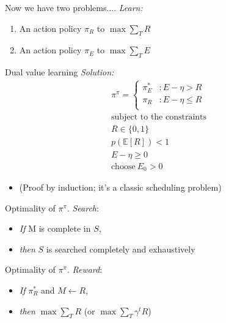 \documentclass[10pt]{beamer}
\begin{document}
\begin{frame}[fragile]{Now we have two problems....}
\textit{Learn:}
\begin{enumerate}
    \item An action policy $\pi_R$ to $\max \sum_T R$
    \item An action policy $\pi_E$ to $\max \sum_T E$
\end{enumerate}
\end{frame}

\begin{frame}[fragile]{Dual value learning}
\textit{Solution:}
\begin{equation*}
    \label{eq:pipi} 
	\begin{split}
		\pi^{\pi} = 
		\begin{cases}
			\pi^*_E & : E - \eta > R \\
			\pi_R & : E - \eta \le R \\
		\end{cases}
		\\
		\text{subject to the constraints}\\
		R \in \{0, 1\} \\
		p(\mathbb E[R]) < 1 \\
		E - \eta \geq 0 \\
		\text{choose}\ E_0 > 0
	\end{split}
\end{equation*}
\begin{itemize}
\item (Proof by induction; it's a classic scheduling problem)
\end{itemize}
\end{frame}

\begin{frame}[fragile]{Optimality of $\pi^\pi$.}
\textit{Search}:
\begin{itemize}
\item \textit{If} M is complete in $S$, 
\item \textit{then} $S$ is searched completely and exhaustively
\end{itemize}
\end{frame}

\begin{frame}[fragile]{Optimality of $\pi^\pi$.}
\textit{Reward}:
\begin{itemize}
    \item \textit{If} $\pi^*_R$ and $M \leftarrow R$,
    \item \textit{then} $\max \sum_T R$ (or $\max \sum_T \gamma^t R$)
\end{itemize}
\end{frame}
\end{document}
